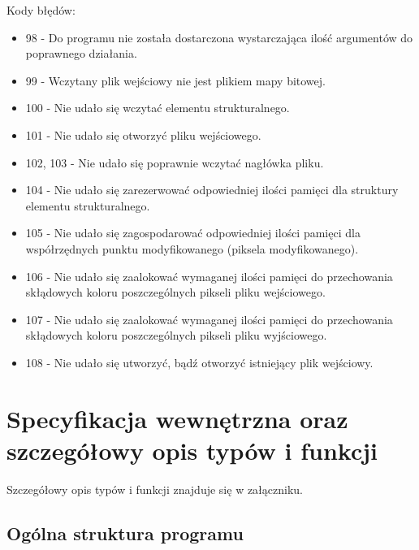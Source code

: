 \documentclass[12pt,a4paper,twoside]{article}
\begin{document}
Kody błędów:
\begin{itemize}
\item 98 - Do programu nie została dostarczona wystarczająca ilość argumentów do poprawnego działania.
\item 99 - Wczytany plik wejściowy nie jest plikiem mapy bitowej.
\item 100 - Nie udało się wczytać elementu strukturalnego.
\item 101 - Nie udało się otworzyć pliku wejściowego.
\item 102, 103 - Nie udało się poprawnie wczytać nagłówka pliku.
\item 104 - Nie udało się zarezerwować odpowiedniej ilości pamięci dla struktury elementu strukturalnego.
\item 105 - Nie udało się zagospodarować odpowiedniej ilości pamięci dla współrzędnych punktu modyfikowanego (piksela modyfikowanego).
\item 106 - Nie udało się zaalokować wymaganej ilości pamięci do przechowania skłądowych koloru poszczególnych pikseli pliku wejściowego.
\item 107 - Nie udało się zaalokować wymaganej ilości pamięci do przechowania skłądowych koloru poszczególnych pikseli pliku wyjściowego.
\item 108 - Nie udało się utworzyć, bądź otworzyć istniejący plik wejściowy.
\end{itemize}



\section{Specyfikacja wewnętrzna oraz szczegółowy opis typów i funkcji}\label{sec:sp-wew}
Szczegółowy opis typów i funkcji znajduje się w załączniku.

\subsection{Ogólna struktura programu}
\end{document}
